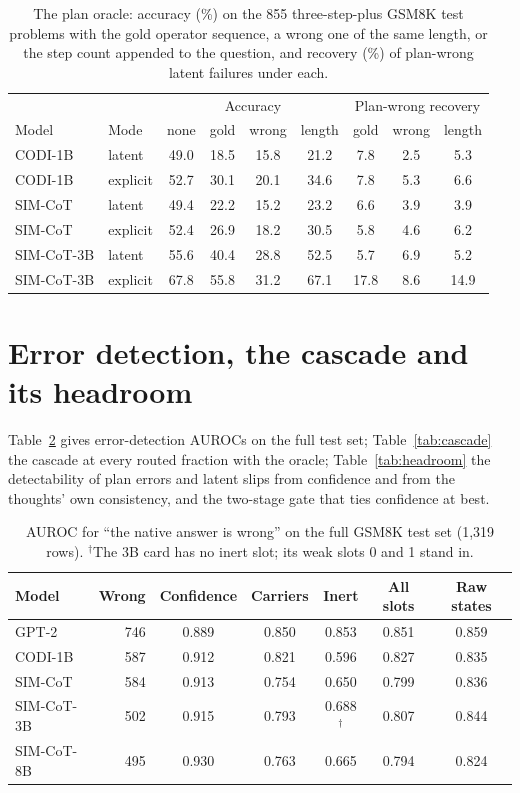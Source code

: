 \begin{table}[htbp]
\caption{The plan oracle: accuracy (\%) on the 855 three-step-plus GSM8K test problems with the gold operator sequence, a wrong one of the same length, or the step count appended to the question, and recovery (\%) of plan-wrong latent failures under each.}
\label{tab:oracle}
\centering
\scriptsize
\setlength{\tabcolsep}{3pt}
\begin{tabular}{llcccc|ccc}
\toprule
 & & \multicolumn{4}{c|}{Accuracy} & \multicolumn{3}{c}{Plan-wrong recovery} \\
Model & Mode & none & gold & wrong & length & gold & wrong & length \\
\midrule
CODI-1B & latent & 49.0 & 18.5 & 15.8 & 21.2 & 7.8 & 2.5 & 5.3 \\
CODI-1B & explicit & 52.7 & 30.1 & 20.1 & 34.6 & 7.8 & 5.3 & 6.6 \\
SIM-CoT & latent & 49.4 & 22.2 & 15.2 & 23.2 & 6.6 & 3.9 & 3.9 \\
SIM-CoT & explicit & 52.4 & 26.9 & 18.2 & 30.5 & 5.8 & 4.6 & 6.2 \\
SIM-CoT-3B & latent & 55.6 & 40.4 & 28.8 & 52.5 & 5.7 & 6.9 & 5.2 \\
SIM-CoT-3B & explicit & 67.8 & 55.8 & 31.2 & 67.1 & 17.8 & 8.6 & 14.9 \\
\bottomrule
\end{tabular}
\end{table}

\section{Error detection, the cascade and its headroom}\label{app:cascade}

Table~\ref{tab:errdet} gives error-detection AUROCs on the full test set; Table~\ref{tab:cascade} the cascade at every routed fraction with the oracle; Table~\ref{tab:headroom} the detectability of plan errors and latent slips from confidence and from the thoughts' own consistency, and the two-stage gate that ties confidence at best.

\begin{table}[htbp]
\caption{AUROC for ``the native answer is wrong'' on the full GSM8K test set (1{,}319 rows). $^\dagger$The 3B card has no inert slot; its weak slots 0 and 1 stand in.}
\label{tab:errdet}
\centering
\small
\begin{tabular}{lrccccc}
\toprule
Model & Wrong & Confidence & Carriers & Inert & All slots & Raw states \\
\midrule
GPT-2 & 746 & 0.889 & 0.850 & 0.853 & 0.851 & 0.859 \\
CODI-1B & 587 & 0.912 & 0.821 & 0.596 & 0.827 & 0.835 \\
SIM-CoT & 584 & 0.913 & 0.754 & 0.650 & 0.799 & 0.836 \\
SIM-CoT-3B & 502 & 0.915 & 0.793 & 0.688$^\dagger$ & 0.807 & 0.844 \\
SIM-CoT-8B & 495 & 0.930 & 0.763 & 0.665 & 0.794 & 0.824 \\
\bottomrule
\end{tabular}
\end{table}

